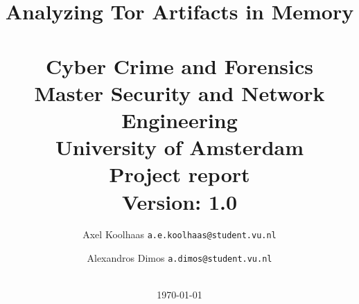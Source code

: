 \documentclass[a4paper,11pt]{article}
\begin{document}
\title{Analyzing Tor Artifacts in Memory \\~\\
\large{Cyber Crime and Forensics \\
Master Security and Network Engineering\\  University of Amsterdam\\
Project report\\}
\textbf{Version:} 1.0}
\author{
    Axel Koolhaas \texttt{a.e.koolhaas@student.vu.nl} \and
    Alexandros Dimos \texttt{a.dimos@student.vu.nl}\\
    \\
}
\date{
    \textnormal \today
}
\maketitle

\clearpage


\clearpage

\tableofcontents
\clearpage








\printbibliography
\end{document}
